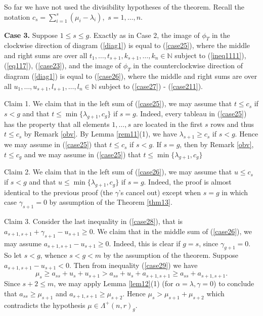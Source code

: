 \documentclass[11pt]{article}
\theoremstyle{definition}
\numberwithin{equation}{section}
\newcommand{\la}{\lambda}
\newcommand{\La}{\Lambda}
\numberwithin{equation}{section}
\begin{document}
So far we have not used the divisibility hypotheses of the theorem. Recall the notation $c_s= \sum_{i=1}^{s}(\mu_i - \lambda_i)$,\ $s=1,\dots,n$.

\textbf{Case 3.} Suppose $1 \le s \le g.$ Exactly as in Case 2, the image of $\phi_T$ in the clockwise direction of diagram (\ref{diag1}) is equal to (\ref{case25}), where the middle and right sums are over all  $t_1,\dots,t_{s+1},k_{s+1},\dots,k_n \in \mathbb{N}$ subject to (\ref{ineq1111}), (\ref{eq117}), (\ref{case23}), and the image of $\phi_T$ in the counterclockwise direction of diagram (\ref{diag1}) is equal to (\ref{case26}), where the middle and right sums are over all  $u_1,\dots,u_{s+1},l_{s+1},\dots,l_n \in \mathbb{N}$ subject to (\ref{case27}) - (\ref{case211}).

Claim 1. We claim that in the left sum of (\ref{case25}), we may assume that $t \le c_s$ if $s<g$ and that $t \le \min\{\lambda_{g+1}, c_g\}$ if $s=g$. Indeed, every tableau in  (\ref{case25}) has the property that all elements $1,\dots,s$ are located in the first $s$ rows and thus $t \le c_s$ by Remark \ref{obv}. By Lemma \ref{rem11}(1), we have $\la_{s+1} \ge c_s$ if $s<g$. Hence we may assume in (\ref{case25}) that $t \le c_s$ if $s<g$. If $s=g$, then by Remark \ref{obv}, $t \le c_g$ and we may assume in (\ref{case25}) that $t \le \min\{\lambda_{g+1}, c_g\}$

Claim 2. We claim that in the left sum of (\ref{case26}), we may assume that $u \le c_s$ if $s<g$ and that $u \le \min\{\lambda_{g+1}, c_g\}$ if $s=g$. Indeed, the proof is almost identical to the previous proof (the $\gamma$'s cancel out) except when $s=g$ in which case $\gamma_{s+1}=0$ by assumption of the Theorem \ref{thm13}.
 
 Claim 3. Consider the last inequality in (\ref{case28}), that is $a_{s+1,s+1}+\gamma_{s+1}-u_{s+1} \ge 0$.  We claim that in the middle sum of (\ref{case26}), we may assume $a_{s+1,s+1}-u_{s+1} \ge 0$. Indeed, this is clear if $g=s$, since $\gamma_{g+1}=0.$ So let $s<g$, whence $s<g<m$ by the assumption of the theorem. Suppose  $a_{s+1,s+1}-u_{s+1}<0$.  Then from inequality (\ref{case29}) we have
 \[\mu_s \ge a_{ss}+u_s+u_{s+1} > a_{ss}+u_s+a_{s+1, s+1} \ge a_{ss}+a_{s+1, s+1}.\]
 Since $s+2 \le m$, we may apply Lemma \ref{lem12}(1) (for $\alpha = \la, \gamma = 0$) to conclude that  $a_{ss} \ge \mu_{s+1}$ and $a_{s+1,s+1} \ge \mu_{s+2}$. Hence $\mu_s > \mu_{s+1}+\mu_{s+2}$ which contradicts the hypothesis $\mu \in \La^{+}(n,r)_g$.
 
\end{document}
